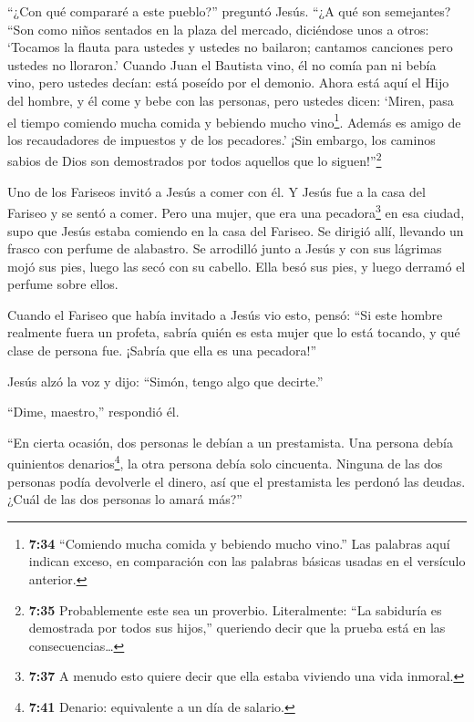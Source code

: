  ``¿Con qué compararé a este pueblo?'' preguntó Jesús. ``¿A
qué son semejantes?  ``Son como niños sentados en la plaza
del mercado, diciéndose unos a otros: `Tocamos la flauta para ustedes y
ustedes no bailaron; cantamos canciones pero ustedes no lloraron.'
 Cuando Juan el Bautista vino, él no comía pan ni bebía
vino, pero ustedes decían: está poseído por el demonio. 
Ahora está aquí el Hijo del hombre, y él come y bebe con las personas,
pero ustedes dicen: `Miren, pasa el tiempo comiendo mucha comida y
bebiendo mucho vino\footnote{\textbf{7:34} ``Comiendo mucha comida y
  bebiendo mucho vino.'' Las palabras aquí indican exceso, en
  comparación con las palabras básicas usadas en el versículo anterior.}.
Además es amigo de los recaudadores de impuestos y de los pecadores.'
 ¡Sin embargo, los caminos sabios de Dios son demostrados
por todos aquellos que lo siguen!''\footnote{\textbf{7:35} Probablemente
  este sea un proverbio. Literalmente: ``La sabiduría es demostrada por
  todos sus hijos,'' queriendo decir que la prueba está en las
  consecuencias\ldots{}}

 Uno de los Fariseos invitó a Jesús a comer con él. Y Jesús
fue a la casa del Fariseo y se sentó a comer.  Pero una
mujer, que era una pecadora\footnote{\textbf{7:37} A menudo esto quiere
  decir que ella estaba viviendo una vida inmoral.} en esa ciudad, supo
que Jesús estaba comiendo en la casa del Fariseo. Se dirigió allí,
llevando un frasco con perfume de alabastro.  Se arrodilló
junto a Jesús y con sus lágrimas mojó sus pies, luego las secó con su
cabello. Ella besó sus pies, y luego derramó el perfume sobre ellos.

 Cuando el Fariseo que había invitado a Jesús vio esto,
pensó: ``Si este hombre realmente fuera un profeta, sabría quién es esta
mujer que lo está tocando, y qué clase de persona fue. ¡Sabría que ella
es una pecadora!''

 Jesús alzó la voz y dijo: ``Simón, tengo algo que
decirte.''

``Dime, maestro,'' respondió él.

 ``En cierta ocasión, dos personas le debían a un
prestamista. Una persona debía quinientos denarios\footnote{\textbf{7:41}
  Denario: equivalente a un día de salario.}, la otra persona debía solo
cincuenta.  Ninguna de las dos personas podía devolverle el
dinero, así que el prestamista les perdonó las deudas. ¿Cuál de las dos
personas lo amará más?''

